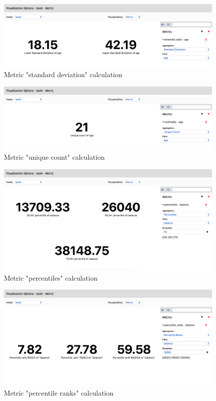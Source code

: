 \documentclass[a4paper, 12pt, english]{book}
\begin{document}
\begin{figure}
  \centering
  \includegraphics[width=13cm, keepaspectratio]{img/metric-std-calculation.png}
  \caption{Metric "standard deviation" calculation}
  \label{fig:metric-std-calcuation}
\end{figure}

\begin{figure}
  \centering
  \includegraphics[width=13cm, keepaspectratio]{img/metric-unique-calculation.png}
  \caption{Metric "unique count" calculation}
  \label{fig:metric-unique-calcuation}
\end{figure}

\begin{figure}
  \centering
  \includegraphics[width=13cm, keepaspectratio]{img/metric-percentiles-calculation.png}
  \caption{Metric "percentiles" calculation}
  \label{fig:metric-percentiles-calcuation}
\end{figure}

\begin{figure}
  \centering
  \includegraphics[width=13cm, keepaspectratio]{img/metric-ranks-calculation.png}
  \caption{Metric "percentile ranks" calculation}
  \label{fig:metric-ranks-calcuation}
\end{figure}
\end{document}
